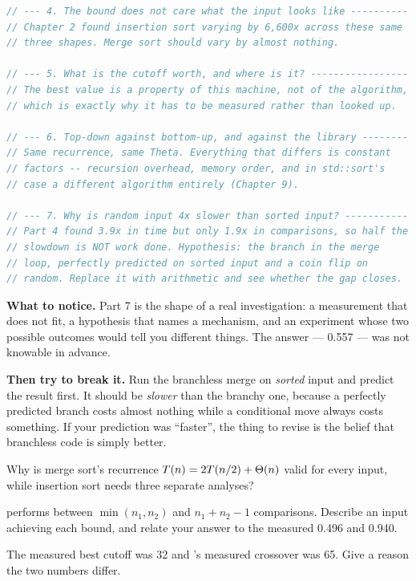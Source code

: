 \begin{lab}
\begin{lstlisting}[language=C++]
// --- 4. The bound does not care what the input looks like ----------
// Chapter 2 found insertion sort varying by 6,600x across these same
// three shapes. Merge sort should vary by almost nothing.

// --- 5. What is the cutoff worth, and where is it? -----------------
// The best value is a property of this machine, not of the algorithm,
// which is exactly why it has to be measured rather than looked up.

// --- 6. Top-down against bottom-up, and against the library --------
// Same recurrence, same Theta. Everything that differs is constant
// factors -- recursion overhead, memory order, and in std::sort's
// case a different algorithm entirely (Chapter 9).

// --- 7. Why is random input 4x slower than sorted input? -----------
// Part 4 found 3.9x in time but only 1.9x in comparisons, so half the
// slowdown is NOT work done. Hypothesis: the branch in the merge
// loop, perfectly predicted on sorted input and a coin flip on
// random. Replace it with arithmetic and see whether the gap closes.
\end{lstlisting}

\textbf{What to notice.} Part 7 is the shape of a real investigation: a
measurement that does not fit, a hypothesis that names a mechanism, and an
experiment whose two possible outcomes would tell you different things. The
answer --- 0.557 --- was not knowable in advance.

\smallskip
\textbf{Then try to break it.} Run the branchless merge on \emph{sorted} input
and predict the result first. It should be \emph{slower} than the branchy one,
because a perfectly predicted branch costs almost nothing while a conditional
move always costs something. If your prediction was ``faster'', the thing to
revise is the belief that branchless code is simply better.
\end{lab}

\begin{checkpoint}
\begin{tightnum}
  \item Why is merge sort's recurrence $T(n) = 2T(n/2) + \Theta(n)$ valid for
        every input, while insertion sort needs three separate analyses?
  \item {} performs between $\min(n_{1},n_{2})$ and
        $n_{1}+n_{2}-1$ comparisons. Describe an input achieving each bound,
        and relate your answer to the measured 0.496 and 0.940.
  \item The measured best cutoff was 32 and 's measured crossover
        was 65. Give a reason the two numbers differ.
\end{tightnum}
\end{checkpoint}

